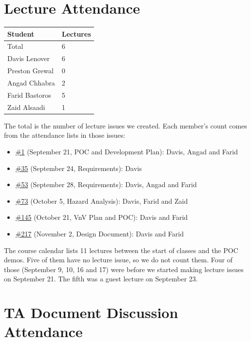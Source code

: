 \documentclass{article}
\begin{document}
\section{Lecture Attendance}

\begin{table}[H]
\centering
\begin{tabular}{ll}
\toprule
\textbf{Student} & \textbf{Lectures}\\
\midrule
Total & 6\\
Davis Lenover & 6\\
Preston Grewal & 0\\
Angad Chhabra & 2\\
Farid Bastoros & 5\\
Zaid Alsaadi & 1\\
\bottomrule
\end{tabular}
\end{table}

The total is the number of lecture issues we created. Each member's count
comes from the attendance lists in those issues:

\begin{itemize}
\item \href{https://github.com/davislenover/BurnNEarn/issues/1}{\#1} (September 21, POC and Development Plan): Davis, Angad and Farid
\item \href{https://github.com/davislenover/BurnNEarn/issues/35}{\#35} (September 24, Requirements): Davis
\item \href{https://github.com/davislenover/BurnNEarn/issues/53}{\#53} (September 28, Requirements): Davis, Angad and Farid
\item \href{https://github.com/davislenover/BurnNEarn/issues/73}{\#73} (October 5, Hazard Analysis): Davis, Farid and Zaid
\item \href{https://github.com/davislenover/BurnNEarn/issues/145}{\#145} (October 21, VnV Plan and POC): Davis and Farid
\item \href{https://github.com/davislenover/BurnNEarn/issues/217}{\#217} (November 2, Design Document): Davis and Farid
\end{itemize}

The course calendar lists 11 lectures between the start of classes and the POC
demos. Five of them have no lecture issue, so we do not count them. Four of
those (September 9, 10, 16 and 17) were before we started making lecture
issues on September 21. The fifth was a guest lecture on September 23.

\section{TA Document Discussion Attendance}
\end{document}
